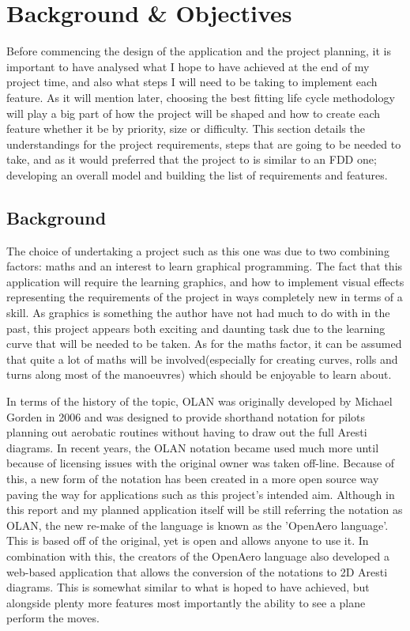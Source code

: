 \chapter{Background \& Objectives}
Before commencing the design of the application and the project planning, it is important to have analysed what I hope to have achieved at the end of my project time, and also what steps I will need to be taking to implement each feature. As it will mention later, choosing the best fitting life cycle methodology will play a big part of how the project will be shaped and how to create each feature whether it be by priority, size or difficulty. This section details the understandings for the project requirements, steps that are going to be needed to take, and as it would preferred that the project to is similar to an FDD one; developing an overall model and building the list of requirements and features.

\section{Background}
The choice of undertaking a project such as this one was due to two combining factors: maths and an interest to learn graphical programming. The fact that this application will require the learning graphics, and how to implement visual effects representing the requirements of the project in ways completely new in terms of a skill. As graphics is something the author have not had much to do with in the past, this project appears both exciting and daunting task due to the learning curve that will be needed to be taken. As for the maths factor, it can be assumed that quite a lot of maths will be involved(especially for creating curves, rolls and turns along most of the manoeuvres) which should be enjoyable to learn about.

In terms of the history of the topic, OLAN was originally developed by Michael Gorden in 2006\cite{Olan_Intro} and was designed to provide shorthand notation for pilots planning out aerobatic routines without having to draw out the full Aresti diagrams. In recent years, the OLAN notation became used much more until because of licensing issues with the original owner was taken off-line. Because of this, a new form of the notation has been created in a more open source way paving the way for applications such as this project's intended aim. Although in this report and my planned application itself will be still referring the notation as OLAN, the new re-make of the language is known as the 'OpenAero language'\cite{OpenAero_Language}. This is based off of the original, yet is open and allows anyone to use it. In combination with this, the creators of the OpenAero language also developed a web-based application\cite{OpenAero_Application} that allows the conversion of the notations to 2D Aresti diagrams. This is somewhat similar to what is hoped to have achieved, but alongside plenty more features most importantly the ability to see a plane perform the moves.

